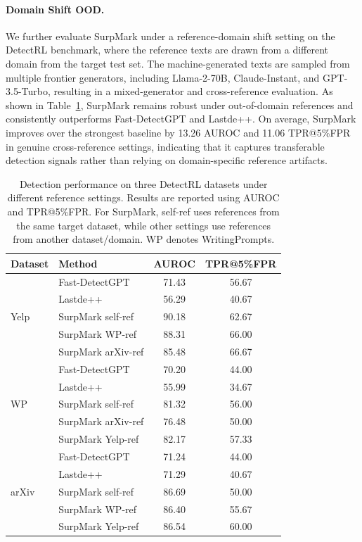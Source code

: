 \documentclass{article}
\theoremstyle{plain}
\theoremstyle{definition}
\theoremstyle{remark}
\begin{document}
\paragraph{Domain Shift OOD.} We further evaluate SurpMark under a reference-domain shift setting on the DetectRL benchmark, where the reference texts are drawn from a different domain from the target test set. 
The machine-generated texts are sampled from multiple frontier generators, including Llama-2-70B, Claude-Instant, and GPT-3.5-Turbo, resulting in a mixed-generator and cross-reference evaluation. 
As shown in Table~\ref{table:ref_transfer}, SurpMark remains robust under out-of-domain references and consistently outperforms Fast-DetectGPT and Lastde++. 
On average, SurpMark improves over the strongest baseline by 13.26 AUROC and 11.06 TPR@5\%FPR in genuine cross-reference settings, indicating that it captures transferable detection signals rather than relying on domain-specific reference artifacts.
\begin{table}[t]
\centering
\caption{Detection performance on three DetectRL datasets under different reference settings. Results are reported using AUROC and TPR@5\%FPR. For SurpMark, self-ref uses references from the same target dataset, while other settings use references from another dataset/domain. WP denotes WritingPrompts.}
\label{table:ref_transfer}
{\scriptsize
\begin{tabular}{llcc}
\toprule
Dataset & Method & AUROC & TPR@5\%FPR \\
\midrule
\multirow{5}{*}{Yelp}
& Fast-DetectGPT & 71.43 & 56.67 \\
& Lastde++ & 56.29 & 40.67 \\
& SurpMark self-ref & 90.18 & 62.67 \\
& SurpMark WP-ref & 88.31 & 66.00 \\
& SurpMark arXiv-ref & 85.48 & 66.67 \\
\midrule
\multirow{5}{*}{WP}
& Fast-DetectGPT & 70.20 & 44.00 \\
& Lastde++ & 55.99 & 34.67 \\
& SurpMark self-ref & 81.32 & 56.00 \\
& SurpMark arXiv-ref & 76.48 & 50.00 \\
& SurpMark Yelp-ref & 82.17 & 57.33 \\
\midrule
\multirow{5}{*}{arXiv}
& Fast-DetectGPT & 71.24 & 44.00 \\
& Lastde++ & 71.29 & 40.67 \\
& SurpMark self-ref & 86.69 & 50.00 \\
& SurpMark WP-ref & 86.40 & 55.67 \\
& SurpMark Yelp-ref & 86.54 & 60.00 \\
\bottomrule
\end{tabular}}
\end{table}
\end{document}
